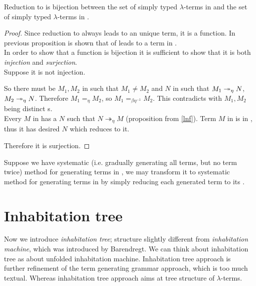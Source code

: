 \documentclass[12pt,a4paper]{report}
\newcommand{\lterms}{$\lambda$-terms\xspace}
\begin{document}
\begin{proposition}

Reduction to \enf is bijection between  
the set of simply typed \lterms in \lnf and 
the set of simply typed \lterms in \benf.
\end{proposition}
\begin{proof}

Since reduction to \enf always leads to an unique term, it is a function.
In previous proposition is shown that \ered of \lnf
leads to a term in \benf.\\

In order to show that a function is bijection it is sufficient to show that it is
both \textit{injection} and \textit{surjection}.\\

Suppose it is not injection.

So there must be $M_1,M_2$ in \lnf such that $M_1 \not= M_2$
and $N$ in \benf such that $M_1 \twoheadrightarrow_\eta N$, $M_2 \twoheadrightarrow_\eta N$.
Therefore $M_1 =_\eta M_2$, 
so $M_1 =_{\beta\eta^{-1}} M_2$.
This contradicts with $M_1,M_2$ being distinct \lnf{}s.\\

Every $M$ in \bnf has a \lnf $N$ such that 
$N \twoheadrightarrow_{\eta} M$ (proposition from \ref{lnf}).
Term $M$ in \benf is in \bnf, thus it has desired \lnf $N$
which reduces to it. 

Therefore it is surjection. 
\end{proof}

Suppose we have systematic (i.e. gradually generating all terms, 
but no term twice) method for generating terms in \lnf,
we may transform it to systematic method for generating terms in \benf
by simply reducing each generated term to its \enf.  




\newpage
\section{Inhabitation tree}

Now we introduce \textit{inhabitation tree}; structure slightly different from
\textit{inhabitation machine}, which was introduced by Barendregt\cite{barendregt10}.
We can think about inhabitation tree as about unfolded inhabitation machine.
Inhabitation tree approach is further refinement 
of the term generating grammar approach, which is too much textual.
Whereas inhabitation tree approach aims at tree structure of \lterms.
\end{document}
